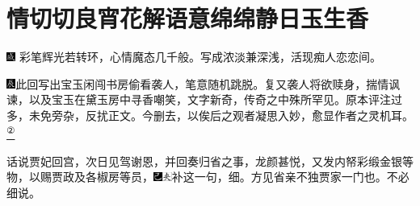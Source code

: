 

\chapter{情切切良宵花解语\hspace{.5em}意绵绵静日玉生香}

{\includegraphics[width=3mm]{../Images/00005}  \kaishu 彩笔辉光若转环，心情魔态几千般。写成浓淡兼深浅，活现痴人恋恋间。}

{\includegraphics[width=3mm]{../Images/00009}此回写出宝玉闲闯书房偷看袭人，笔意随机跳脱。复又袭人将欲赎身，揣情讽谏，以及宝玉在黛玉房中寻香嘲笑，文字新奇，传奇之中殊所罕见。原本评注过多，未免旁杂，反扰正文。今删去，以俟后之观者凝思入妙，愈显作者之灵机耳。}\href{../Text/part0023_split_000.html\#lnkback_2_a}{\textsuperscript{②}}{}

话说贾妃回宫，次日见驾谢恩，并回奏归省之事，龙颜甚悦，又发内帑彩缎金银等物，以赐贾政及各椒房等员，{\includegraphics[width=3mm]{../Images/00003}\includegraphics[width=3mm]{../Images/00012}\footnotesize \kaishu 补这一句，细。方见省亲不独贾家一门也。}不必细说。


